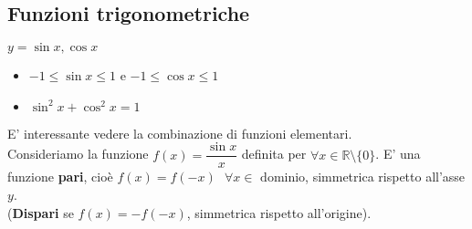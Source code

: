 \documentclass[../../main.tex]{subfiles}
\begin{document}
\subsection{Funzioni trigonometriche}
$y = \sin x, \cos x$
\begin{itemize}
    \item $-1 \leq \sin x \leq 1$ e $-1 \leq \cos x \leq 1$
    \item $\sin^2 x + \cos^2 x = 1$
\end{itemize}
\begin{center}
\end{center}
E' interessante vedere la combinazione di funzioni elementari.\\
Consideriamo la funzione $f(x) = \dfrac{\sin x}{x}$ definita per $\forall x \in \mathbb{R} \setminus \{0\}$.
E' una funzione \textbf{pari}, cioè $f(x) = f(-x) \ \ \ \forall x \in \text{ dominio}$, simmetrica rispetto all'asse $y$.\\
(\textbf{Dispari} se $f(x) = -f(-x)$, simmetrica rispetto all'origine).\\
\end{document}
